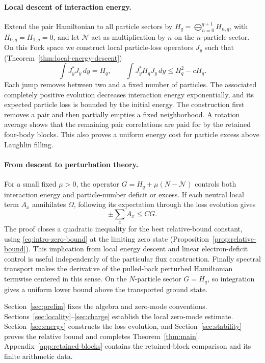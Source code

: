 \paragraph{Local descent of interaction energy.}
Extend the pair Hamiltonian to all particle sectors by
$H_q=\bigoplus_{n=0}^{q+1}H_{n,q}$, with $H_{0,q}=H_{1,q}=0$,
and let $\mathcal N$ act as multiplication by $n$ on the $n$-particle
sector. On this Fock space we construct local particle-loss operators
$J_y$ such that (Theorem~\ref{thm:local-energy-descent})
\begin{equation}\label{eq:intro-descent}
 \int J_y^*J_y\,dy=H_q,\qquad
 \int J_y^*H_qJ_y\,dy\le H_q^2-cH_q.
\end{equation}
Each jump removes between two and a fixed number of particles.
The associated completely positive evolution decreases interaction
energy exponentially, and its expected particle loss is bounded by
the initial energy. The construction first removes a pair and then
partially empties a fixed neighborhood. A rotation average shows
that the remaining pair correlations are paid for by the retained
four-body blocks. This also proves a uniform energy cost for
particle excess above Laughlin filling.

\paragraph{From descent to perturbation theory.}
For a small fixed $\mu>0$, the operator
$G=H_q+\mu(N-\mathcal N)$ controls both interaction energy and
particle-number deficit or excess. If each neutral local term
$A_x$ annihilates $\Omega$, following its expectation through the
loss evolution gives
\[
 \pm\sum_xA_x\le CG.
\]
The proof closes a quadratic inequality for the best relative-bound
constant, using \eqref{eq:intro-zero-bound} at the limiting zero
state (Proposition~\ref{prop:relative-bound}). This implication from
local energy descent and linear electron-deficit
control is useful independently of the particular flux construction.
Finally spectral transport makes the derivative of the pulled-back
perturbed Hamiltonian termwise centered in this sense. On the
$N$-particle sector $G=H_q$, so integration gives a uniform lower
bound above the transported ground state.

Section~\ref{sec:prelim} fixes the algebra and zero-mode conventions.
Sections~\ref{sec:locality}--\ref{sec:charge} establish the local
zero-mode estimate. Section~\ref{sec:energy} constructs the loss
evolution, and Section~\ref{sec:stability} proves the relative bound
and completes Theorem~\ref{thm:main}. Appendix~\ref{app:retained-blocks}
contains the retained-block comparison and its finite arithmetic data.
